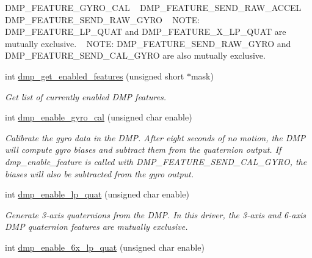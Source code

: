 \begin{DoxyCompactItemize}
\begin{DoxyCompactList}
 D\+M\+P\+\_\+\+F\+E\+A\+T\+U\+R\+E\+\_\+\+G\+Y\+R\+O\+\_\+\+C\+AL ~\newline
 D\+M\+P\+\_\+\+F\+E\+A\+T\+U\+R\+E\+\_\+\+S\+E\+N\+D\+\_\+\+R\+A\+W\+\_\+\+A\+C\+C\+EL ~\newline
 D\+M\+P\+\_\+\+F\+E\+A\+T\+U\+R\+E\+\_\+\+S\+E\+N\+D\+\_\+\+R\+A\+W\+\_\+\+G\+Y\+RO ~\newline
 N\+O\+TE\+: D\+M\+P\+\_\+\+F\+E\+A\+T\+U\+R\+E\+\_\+\+L\+P\+\_\+\+Q\+U\+AT and D\+M\+P\+\_\+\+F\+E\+A\+T\+U\+R\+E\+\_\+X\+\_\+\+L\+P\+\_\+\+Q\+U\+AT are mutually exclusive. ~\newline
 N\+O\+TE\+: D\+M\+P\+\_\+\+F\+E\+A\+T\+U\+R\+E\+\_\+\+S\+E\+N\+D\+\_\+\+R\+A\+W\+\_\+\+G\+Y\+RO and D\+M\+P\+\_\+\+F\+E\+A\+T\+U\+R\+E\+\_\+\+S\+E\+N\+D\+\_\+\+C\+A\+L\+\_\+\+G\+Y\+RO are also mutually exclusive. \end{DoxyCompactList}\item 
int \hyperlink{group___d_r_i_v_e_r_s_ga92b920b72f5146ea14d45ad2d529b64c}{dmp\+\_\+get\+\_\+enabled\+\_\+features} (unsigned short $\ast$mask)
\begin{DoxyCompactList}\small\item\em Get list of currently enabled D\+MP features. \end{DoxyCompactList}\item 
int \hyperlink{group___d_r_i_v_e_r_s_ga653ebcec6758f006dd89939e8f3c6ebb}{dmp\+\_\+enable\+\_\+gyro\+\_\+cal} (unsigned char enable)
\begin{DoxyCompactList}\small\item\em Calibrate the gyro data in the D\+MP. After eight seconds of no motion, the D\+MP will compute gyro biases and subtract them from the quaternion output. If {\itshape dmp\+\_\+enable\+\_\+feature} is called with {\itshape D\+M\+P\+\_\+\+F\+E\+A\+T\+U\+R\+E\+\_\+\+S\+E\+N\+D\+\_\+\+C\+A\+L\+\_\+\+G\+Y\+RO}, the biases will also be subtracted from the gyro output. \end{DoxyCompactList}\item 
int \hyperlink{group___d_r_i_v_e_r_s_ga4ee4339b79a58558d121ba8206056394}{dmp\+\_\+enable\+\_\+lp\+\_\+quat} (unsigned char enable)
\begin{DoxyCompactList}\small\item\em Generate 3-\/axis quaternions from the D\+MP. In this driver, the 3-\/axis and 6-\/axis D\+MP quaternion features are mutually exclusive. \end{DoxyCompactList}\item 
int \hyperlink{group___d_r_i_v_e_r_s_gaac712ef33727433f666b3861894873be}{dmp\+\_\+enable\+\_\+6x\+\_\+lp\+\_\+quat} (unsigned char enable)

\end{DoxyCompactItemize}
